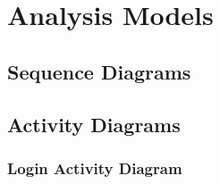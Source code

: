 \section{Analysis Models}
	
	\subsection{Sequence Diagrams}
	\subsection{Activity Diagrams}
		\subsubsection{Login Activity Diagram}
		\centerline{}

